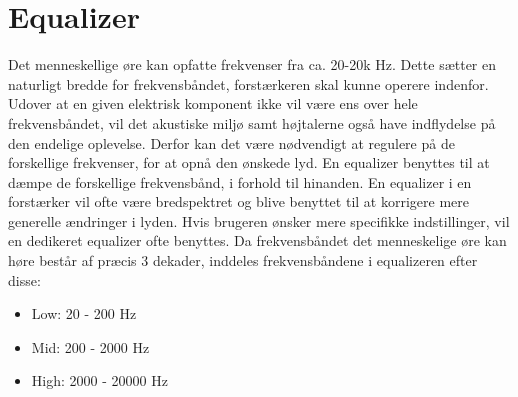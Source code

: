 \section{Equalizer}
\label{equalizer}
Det menneskellige øre kan opfatte frekvenser fra ca. 20-20k Hz. Dette sætter en naturligt bredde for frekvensbåndet, forstærkeren skal kunne operere indenfor. Udover at en given elektrisk komponent ikke vil være ens over hele frekvensbåndet, vil det akustiske miljø samt højtalerne også have indflydelse på den endelige oplevelse.  Derfor kan det være nødvendigt at regulere på de forskellige frekvenser, for at opnå den ønskede lyd. En equalizer benyttes til at dæmpe de forskellige frekvensbånd, i forhold til hinanden. En equalizer i en forstærker vil ofte være bredspektret og blive benyttet til at korrigere mere generelle ændringer i lyden. Hvis brugeren ønsker mere specifikke indstillinger, vil en dedikeret equalizer ofte benyttes. Da frekvensbåndet det menneskelige øre kan høre består af præcis 3 dekader, inddeles frekvensbåndene i equalizeren efter disse:

\begin{itemize}
\item Low: 20 - 200 Hz
\item Mid: 200 - 2000 Hz
\item High: 2000 - 20000 Hz
\end{itemize}

